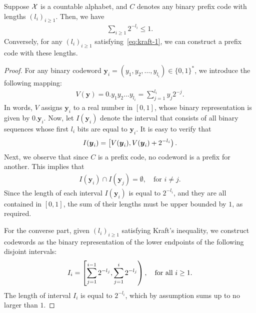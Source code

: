     \begin{theorem}
        \label{thm:kraft-prefix-1}  Suppose $\mathcal{X}$ is a countable alphabet, and $C$ denotes any binary prefix code with lengths $(l_i)_{i \geq 1}$. Then, we have 
        \begin{align}
            \sum_{i \geq 1} 2^{-l_i} \leq 1.  \label{eq:kraft-1}
        \end{align}
        Conversely, for any $(l_i)_{i \geq 1}$ satisfying~\eqref{eq:kraft-1}, we can construct a prefix code with these lengths. 
    \end{theorem}
    \begin{proof}
        For any binary codeword $\boldsymbol{y}_i = (y_1, y_2, \ldots, y_{l_i}) \in \{0, 1\}^*$, we introduce the following mapping: 
        \begin{align}
            V(\boldsymbol{y}) = 0.y_1y_2 \ldots y_{l_i} = \sum_{j=1}^{l_i} y_j 2^{-j}.    
        \end{align}
        In words, $V$ assigns $\boldsymbol{y}_i$ to a real number in $[0, 1]$, whose binary representation is given by $0.\boldsymbol{y}_i$. Now, let $I(\boldsymbol{y}_i)$ denote the interval that consists of all binary sequences whose first $l_i$ bits are equal to $\boldsymbol{y}_i$. It is easy to verify that 
        \begin{align}
            I(\boldsymbol{y}_i) = \left[ V(\boldsymbol{y}_i), V(\boldsymbol{y}_i) + 2^{-l_i} \right).  
        \end{align}
        Next, we observe that since $C$ is a prefix code, no codeword is a prefix for another. This implies that 
        \begin{align}
            I(\boldsymbol{y}_i) \cap I(\boldsymbol{y}_j) = \emptyset, \quad \text{for } i \neq j. 
        \end{align}
        Since the length of each interval $I(\boldsymbol{y}_i)$ is equal to $2^{-l_i}$, and they are all contained in $[0, 1]$, the sum of their lengths must be upper bounded by $1$, as required. 

        For the converse part, given $(l_i)_{i \geq 1}$ satisfying Kraft's inequality, we construct codewords as the binary representation of the lower endpoints of the following disjoint intervals: 
        \begin{align}
            I_i = \left[ \sum_{j=1}^{i-1} 2^{-l_j}, \sum_{j=1}^{i} 2^{-l_j} \right), \quad \text{for all } i \geq 1.  
        \end{align}
        The length of interval $I_i$ is equal to $2^{-l_i}$, which by assumption sums up to no larger than $1$. 
    \end{proof}

